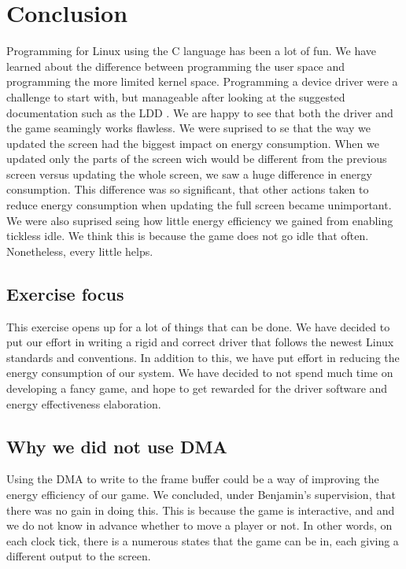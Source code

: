 \section{Conclusion}
Programming for Linux using the C language has been a lot of fun. We have learned about the difference between programming the user space and programming the more limited kernel space. Programming a device driver were a challenge to start with, but manageable after looking at the suggested documentation such as the LDD \cite{ldd}. We are happy to see that both the driver and the game seamingly works flawless. We were suprised to se that the way we updated the screen had the biggest impact on energy consumption. When we updated only the parts of the screen wich would be different from the previous screen versus updating the whole screen, we saw a huge difference in energy consumption. This difference was so significant, that other actions taken to reduce energy consumption when updating the full screen became unimportant. We were also suprised seing how little energy efficiency we gained from enabling tickless idle. We think this is
because the game does not go idle that often. Nonetheless, every little helps.

\subsection{Exercise focus}
This exercise opens up for a lot of things that can be done. We have decided to put our effort in writing a rigid and correct driver that follows the newest Linux standards and conventions. In addition to this, we have put effort in reducing the energy consumption of our system. We have decided to not spend much time on developing a fancy game, and hope to get rewarded for the driver software and energy effectiveness elaboration. 

\subsection{Why we did not use DMA}
Using the DMA to write to the frame buffer could be a way of improving the energy efficiency of our game. We concluded, under Benjamin's supervision, that there was no gain in doing this. This is because the game is interactive, and and we do not know in advance whether to move a player or not. In other words, on each clock tick, there is a numerous states that the game can be in, each giving a different output to the screen.
